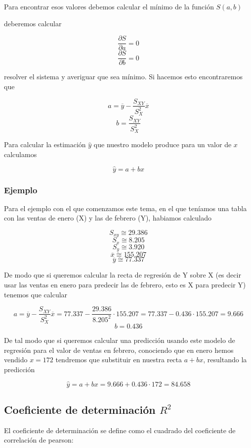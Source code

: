 \documentclass[]{book}
\theoremstyle{plain}
\theoremstyle{definition}
\begin{document}
Para encontrar esos valores debemos calcular el mínimo de la función
\(S(a,b)\)

deberemos calcular

\[\frac {\partial S}{\partial a}=0\]
\[\frac {\partial S}{\partial b}=0\]

resolver el sistema y averiguar que sea mínimo. Si hacemos esto
encontraremos que

\[a = \overline{y} - \frac{S_{XY}}{S^2_X} \overline x\]
\[b = \frac{S_{XY}}{S^2_X}\]

Para calcular la estimación \(\hat y\) que nuestro modelo produce para
un valor de \(x\) calculamos

\[\hat y = a + b x\]

\hypertarget{ejemplo-2}{%
\subsubsection{Ejemplo}\label{ejemplo-2}}

Para el ejemplo con el que comenzamos este tema, en el que teníamos una
tabla con las ventas de enero (X) y las de febrero (Y), habiamos
calculado

\[S_{xy} \cong 29.386\] \[S_x \cong 8.205\] \[S_y \cong 3.920\]
\[\overline x \cong155.207\] \[\overline y \cong77.337 \]

De modo que si queremos calcular la recta de regresión de Y sobre X (es
decir usar las ventas en enero para predecir las de febrero, esto es X
para predecir Y) tenemos que calcular

\[a = \overline{y} - \frac{S_{XY}}{S^2_X} \overline x = 77.337 - \frac{29.386}{8.205^2}\cdot 155.207 = 77.337 - 0.436 \cdot 155.207 = 9.666\]
\[b = 0.436\]

De tal modo que si queremos calcular una predicción usando este modelo
de regresión para el valor de ventas en febrero, conociendo que en enero
hemos vendido \(x=172\) tendremos que substituir en nuestra recta
\(a + bx\), resultando la predicción

\[\hat y = a+bx = 9.666 + 0.436 \cdot 172 = 84.658\]

\hypertarget{coeficiente-de-determinaciuxf3n-r2}{%
\subsection{\texorpdfstring{Coeficiente de determinación
\(R^2\)}{Coeficiente de determinación R\^{}2}}\label{coeficiente-de-determinaciuxf3n-r2}}

El coeficiente de determinación se define como el cuadrado del
coeficiente de correlación de pearson:
\end{document}
